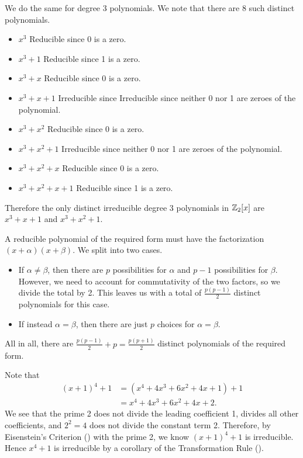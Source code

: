 \begin{questions}
\begin{partquestions}{\alph*}
        \item We do the same for degree 3 polynomials. We note that there are 8 such distinct polynomials.
        \begin{itemize}
            \item $\boxed{x^3}$ Reducible since 0 is a zero.
            \item $\boxed{x^3 + 1}$ Reducible since 1 is a zero.
            \item $\boxed{x^3 + x}$ Reducible since 0 is a zero.
            \item $\boxed{x^3 + x + 1}$ Irreducible since Irreducible since neither 0 nor 1 are zeroes of the polynomial.
            \item $\boxed{x^3 + x^2}$ Reducible since 0 is a zero.
            \item $\boxed{x^3 + x^2 + 1}$ Irreducible since neither 0 nor 1 are zeroes of the polynomial.
            \item $\boxed{x^3 + x^2 + x}$ Reducible since 0 is a zero.
            \item $\boxed{x^3 + x^2 + x + 1}$ Reducible since 1 is a zero.
        \end{itemize}
        Therefore the only distinct irreducible degree 3 polynomials in $\mathbb{Z}_2[x]$ are $x^3+x+1$ and $x^3+x^2+1$.
    \end{partquestions}

    \item A reducible polynomial of the required form must have the factorization $(x+\alpha)(x+\beta)$. We split into two cases.
    \begin{itemize}
        \item If $\alpha \neq \beta$, then there are $p$ possibilities for $\alpha$ and $p - 1$ possibilities for $\beta$. However, we need to account for commutativity of the two factors, so we divide the total by 2. This leaves us with a total of $\frac{p(p-1)}{2}$ distinct polynomials for this case.
        \item If instead $\alpha = \beta$, then there are just $p$ choices for $\alpha = \beta$.
    \end{itemize}
    All in all, there are $\frac{p(p-1)}{2} + p = \frac{p(p+1)}{2}$ distinct polynomials of the required form.

    \item \begin{partquestions}{\alph*}
        \item Note that
        \begin{align*}
            (x+1)^4 + 1 &= (x^4 + 4x^3 + 6x^2 + 4x + 1) + 1\\
            &= x^4 + 4x^3 + 6x^2 + 4x + 2.
        \end{align*}
        We see that the prime 2 does not divide the leading coefficient 1, divides all other coefficients, and $2^2 = 4$ does not divide the constant term 2. Therefore, by Eisenstein's Criterion () with the prime 2, we know $(x+1)^4 + 1$ is irreducible. Hence $x^4 + 1$ is irreducible by a corollary of the Transformation Rule ().


\end{partquestions}
\end{questions}

